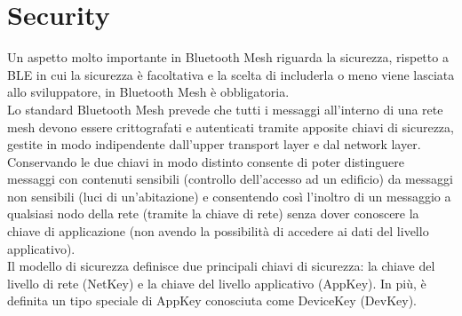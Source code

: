 \section{Security}
Un aspetto molto importante in Bluetooth Mesh riguarda la sicurezza, rispetto a BLE in cui la sicurezza è facoltativa e la scelta di includerla o meno viene lasciata allo sviluppatore, in Bluetooth Mesh è obbligatoria.\\
Lo standard Bluetooth Mesh prevede che tutti i messaggi all'interno di una rete mesh devono essere crittografati e autenticati tramite apposite chiavi di sicurezza, gestite in modo indipendente dall'upper transport layer e dal network layer. \\
Conservando le due chiavi in modo distinto consente di poter distinguere messaggi con contenuti sensibili (controllo dell'accesso ad un edificio) da messaggi non sensibili (luci di un'abitazione) e consentendo così l'inoltro di un messaggio a qualsiasi nodo della rete (tramite la chiave di rete) senza dover conoscere la chiave di applicazione (non avendo la possibilità di accedere ai dati del livello applicativo).\\

\noindent Il modello di sicurezza definisce due principali chiavi di sicurezza: la chiave del livello di rete (NetKey) e la chiave del livello applicativo (AppKey). In più, è definita un tipo speciale di AppKey conosciuta come DeviceKey (DevKey).

